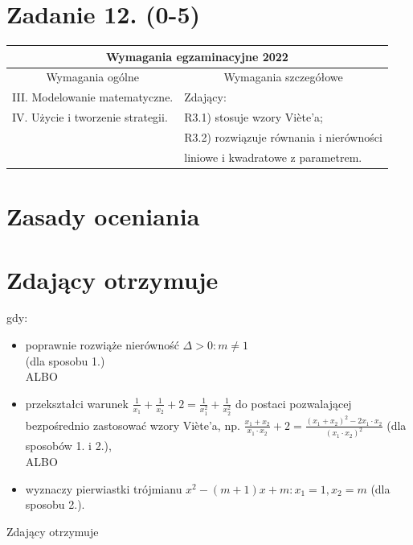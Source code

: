 \documentclass[10pt]{article}
\begin{document}
\section*{Zadanie 12. (0-5)}
\begin{center}
\begin{tabular}{|l|l|}
\hline
\multicolumn{2}{|c|}{Wymagania egzaminacyjne 2022} \\
\hline
\multicolumn{1}{|c|}{Wymagania ogólne} & \multicolumn{1}{c|}{Wymagania szczegółowe} \\
\hline
III. Modelowanie matematyczne. & Zdający: \\
IV. Użycie i tworzenie strategii. & R3.1) stosuje wzory Viète'a; \\
 & R3.2) rozwiązuje równania i nierówności \\
 & liniowe i kwadratowe z parametrem. \\
\hline
\end{tabular}
\end{center}

\section*{Zasady oceniania}
\section*{Zdający otrzymuje}
gdy:

\begin{itemize}
  \item poprawnie rozwiąże nierówność $\Delta>0: m \neq 1$\\
(dla sposobu 1.)\\
ALBO
  \item przekształci warunek $\frac{1}{x_{1}}+\frac{1}{x_{2}}+2=\frac{1}{x_{1}^{2}}+\frac{1}{x_{2}^{2}}$ do postaci pozwalającej bezpośrednio zastosować wzory Viète'a, np. $\frac{x_{1}+x_{2}}{x_{1} \cdot x_{2}}+2=\frac{\left(x_{1}+x_{2}\right)^{2}-2 x_{1} \cdot x_{2}}{\left(x_{1} \cdot x_{2}\right)^{2}}$ (dla sposobów 1. i 2.),\\
ALBO
  \item wyznaczy pierwiastki trójmianu $x^{2}-(m+1) x+m: x_{1}=1, x_{2}=m$ (dla sposobu 2.).
\end{itemize}

Zdający otrzymuje
\end{document}
